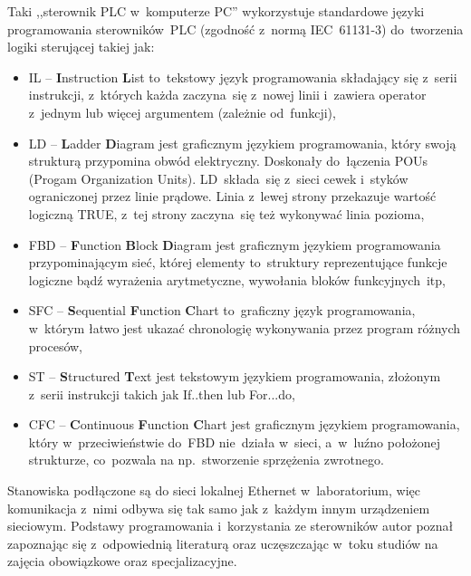 Taki ,,sterownik PLC w~komputerze PC'' wykorzystuje standardowe języki programowania sterowników~PLC (zgodność z~normą IEC~61131-3) do~tworzenia logiki sterującej takiej jak:
\begin{itemize}
\item IL -- \textbf{I}nstruction \textbf{L}ist to~tekstowy język programowania składający się z~serii instrukcji, z~których każda zaczyna~się z~nowej linii i~zawiera operator z~jednym lub więcej argumentem (zależnie od~funkcji),

\item LD -- \textbf{L}adder \textbf{D}iagram jest graficznym językiem programowania, który swoją strukturą przypomina obwód elektryczny. Doskonały do~łączenia POUs (Progam Organization Units). LD~składa~się z~sieci cewek i~styków ograniczonej przez linie prądowe. Linia z~lewej strony przekazuje wartość logiczną TRUE, z~tej strony zaczyna~się też wykonywać linia pozioma,

\item FBD -- \textbf{F}unction \textbf{B}lock \textbf{D}iagram jest graficznym językiem programowania przypominającym sieć, której elementy to~struktury reprezentujące funkcje logiczne bądź wyrażenia arytmetyczne, wywołania bloków funkcyjnych~itp,

\item SFC -- \textbf{S}equential \textbf{F}unction \textbf{C}hart to~graficzny język programowania, w~którym łatwo jest ukazać chronologię wykonywania przez program różnych procesów,

\item ST -- \textbf{S}tructured \textbf{T}ext jest tekstowym językiem programowania, złożonym z~serii instrukcji takich jak If..then lub For...do,

\item CFC -- \textbf{C}ontinuous \textbf{F}unction \textbf{C}hart jest graficznym językiem programowania, który w~przeciwieństwie do~FBD nie~działa w~sieci, a~w~luźno położonej strukturze, co~pozwala na np.~stworzenie sprzężenia zwrotnego.
\end{itemize}

\indent
\indent Stanowiska podłączone są do sieci lokalnej Ethernet w~laboratorium, więc komunikacja z~nimi odbywa się tak samo jak z~każdym innym urządzeniem sieciowym. Podstawy programowania i~korzystania ze sterowników autor poznał zapoznając się z~odpowiednią literaturą \cite{plc1,plc2,plc4,plc5,plc6} oraz uczęszczając w~toku studiów na zajęcia obowiązkowe oraz specjalizacyjne.

